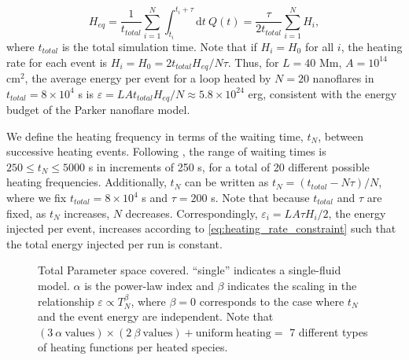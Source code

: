\documentclass[preprint,linenumbers]{aastex}
\begin{document}
	\begin{equation}
		\label{eq:heating_rate_constraint}
		H_{eq} = \frac{1}{t_{total}}\sum_{i=1}^N\int_{t_i}^{t_i+\tau}\mathrm{d}t~Q(t) = \frac{\tau}{2t_{total}}\sum_{i=1}^NH_i,
	\end{equation}
	where $t_{total}$ is the total simulation time. Note that if $H_i=H_0$ for all $i$, the heating rate for each event is $H_i=H_0=2t_{total}H_{eq}/N\tau$. Thus, for $L=40$ Mm, $A=10^{14}$ cm$^2$, the average energy per event for a loop heated by $N=20$ nanoflares in $t_{total}=8\times10^4$ s is $\varepsilon=LAt_{total}H_{eq}/N\approx5.8\times10^{24}$ erg, consistent with the energy budget of the Parker nanoflare model. 
	\par We define the heating frequency in terms of the waiting time, $t_N$, between successive heating events. Following \citet{cargill_active_2014}, the range of waiting times is $250\le t_N\le5000$ s in increments of 250 s, for a total of 20 different possible heating frequencies. Additionally, $t_N$ can be written as $t_N=(t_{total}-N\tau)/N$, where we fix $t_{total}=8\times10^4$ s and $\tau=200$ s. Note that because $t_{total}$ and $\tau$ are fixed, as $t_N$ increases, $N$ decreases. Correspondingly, $\varepsilon_i=LA\tau H_i/2$, the energy injected per event, increases according to \autoref{eq:heating_rate_constraint} such that the total energy injected per run is constant.
	\begin{figure}
		\centering
		
		\caption{Total Parameter space covered. ``single'' indicates a single-fluid model. $\alpha$ is the power-law index and $\beta$ indicates the scaling in the relationship $\varepsilon\propto T_N^{\beta}$, where $\beta=0$ corresponds to the case where $t_N$ and the event energy are independent. Note that $(3~\alpha~\mathrm{values})\times(2~\beta~\mathrm{values})+\mathrm{uniform~heating}=$ 7 different types of heating functions per heated species.}
		\label{fig:parameter_space}
	\end{figure}
\end{document}
